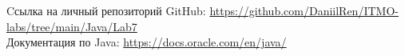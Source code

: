 \begin{thebibliography}{}
     Cсылка на личный репозиторий GitHub: \url{https://github.com/DaniilRen/ITMO-labs/tree/main/Java/Lab7}\\
     Документация по Java: \url{https://docs.oracle.com/en/java/}
\end{thebibliography}